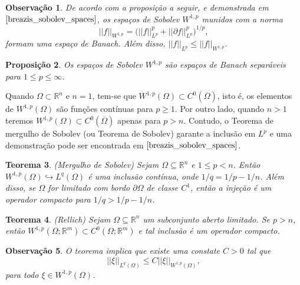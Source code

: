\documentclass[12pt]{book}
\newtheorem{teorema}{Teorema}[section]
\newtheorem{observacao}[teorema]{Observação}
\newtheorem{proposicao}[teorema]{Proposição}
\newcommand{\bigparenteses}[1]{\Big( #1 \Big) }
\newcommand{\espacoLpGeral}[2]{L^{#1}(#2)}
\newcommand{\espacosobolev}[1]{W^{1,p}(#1)}
\newcommand{\espacosobolevcontradominio}[2]{W^{1,p}(#1;#2)}
\newcommand{\norma}[1]{||#1||}
\newcommand{\normaLp}[1]{||#1||_{L^{p}}}
\newcommand{\normaLgGeral}[3]{\norma{#1}_{\espacoLpGeral{#2}{#3}}}
\newcommand{\normaWp}[1]{||#1||_{W^{1,p}}}
\newcommand{\normaWpGeralDominio}[3]{\norma{#1}_{W^{1,#2}(#3)}}
\newcommand{\real}[1]{\mathbb{R}^{#1}}
\begin{document}
	\begin{observacao}
		De acordo com a proposição a seguir, e demonstrada em $\cite{breazis_sobolev_spaces}$, os espaços de Sobolev $W^{1,p}$ munidos com a norma 
		$$
		\normaWp{f} = \bigparenteses{\normaLp{f}^{p} + \normaLp{\partial f}^{p} }^{1/p},
		$$ formam uma espaço de Banach. Além disso, $\normaLp{f} \leq \normaWp{f}$.
	\end{observacao}
	
	\begin{proposicao}
		Os espaços de Sobolev $W^{1,p}$ são espaços de Banach separáveis para $1\leq p \leq \infty$.
	\end{proposicao}
	
	Quando $\Omega\subset\real{n}$ e $n=1$, tem-se que $\espacosobolev{\Omega} \subset C^{0}(\overline{\Omega})$, isto é, os elementos de $\espacosobolev{\Omega}$ são funções contínuas para $p \geq 1$. Por outro lado, quando $n>1$ teremos $\espacosobolev{\Omega} \subset C^{0}(\overline{\Omega})$ apenas para $p>n$. Contudo, o Teorema de mergulho de Sobolev (ou Teorema de Sobolev) garante a inclusão em $L^{p}$ e uma demonstração pode ser encontrada em $\cite{breazis_sobolev_spaces}$.	
	
	\begin{teorema}\label{teorema_sobolev}
		(Mergulho de Sobolev) Sejam $\Omega \subseteq \real{n}$ e $1 \leq p < n$. Então $\espacosobolev{\Omega} \hookrightarrow L^{q}(\Omega)$ é uma inclusão contínua, onde $1/q = 1/p -1/n$. Além disso, se $\Omega$ for limitado com bordo $\partial\Omega$ de classe $C^{1}$, então a injeção é um operador compacto para $1/q>1/p -1/n$.
	\end{teorema}
	
	\begin{teorema}\label{teorema_rellich}
		(Rellich) Sejam $\Omega \subseteq \real{n}$ um subconjunto aberto limitado. Se $p>n$, então $\espacosobolevcontradominio{\Omega}{\real{m}} \subset C^{0}(\Omega;\real{m})$ e tal inclusão é um operador compacto.
	\end{teorema}
	
	
	\begin{observacao}
		O teorema implica que existe uma constate $C>0$ tal que 
		$$
		\normaLgGeral{\xi}{q}{\Omega} \leq C \normaWpGeralDominio{\xi}{p}{\Omega},
		$$
		para todo $\xi\in \espacosobolev{\Omega}$.
	\end{observacao}
	
\end{document}
